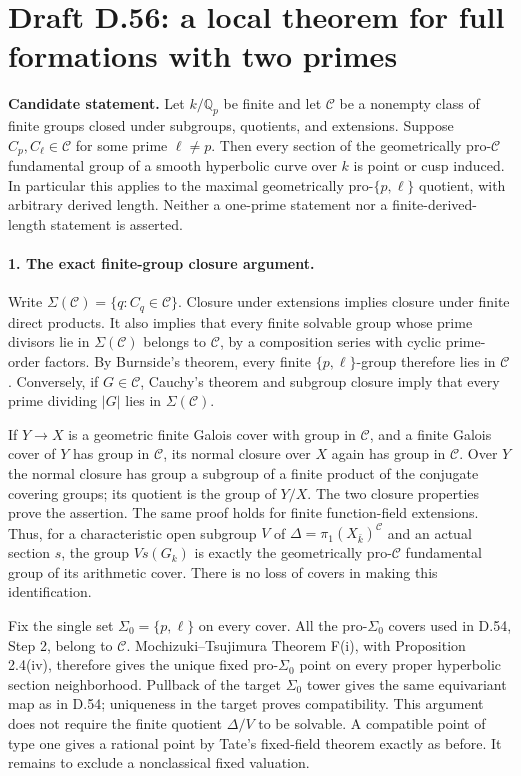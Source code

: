 \section*{Draft D.56: a local theorem for full formations with two primes}

\noindent\textbf{Candidate statement.}
Let $k/\mathbb Q_p$ be finite and let $\mathcal C$ be a nonempty
class of finite groups closed under subgroups, quotients, and
extensions.  Suppose $C_p,C_\ell\in\mathcal C$ for some prime
$\ell\ne p$.  Then every section of the geometrically pro-$\mathcal C$
fundamental group of a smooth hyperbolic curve over $k$ is point
or cusp induced.  In particular this applies to the maximal
geometrically pro-$\{p,\ell\}$ quotient, with arbitrary derived
length.  Neither a one-prime statement nor a finite-derived-length
statement is asserted.

\paragraph{1. The exact finite-group closure argument.}

Write $\Sigma(\mathcal C)=\{q:C_q\in\mathcal C\}$.  Closure under
extensions implies closure under finite direct products.  It also
implies that every finite solvable group whose prime divisors lie
in $\Sigma(\mathcal C)$ belongs to $\mathcal C$, by a composition
series with cyclic prime-order factors.  By Burnside's theorem,
every finite $\{p,\ell\}$-group therefore lies in $\mathcal C$.
Conversely, if $G\in\mathcal C$, Cauchy's theorem and subgroup
closure imply that every prime dividing $|G|$ lies in
$\Sigma(\mathcal C)$.

If $Y\to X$ is a geometric finite Galois cover with group in
$\mathcal C$, and a finite Galois cover of $Y$ has group in
$\mathcal C$, its normal closure over $X$ again has group in
$\mathcal C$.  Over $Y$ the normal closure has group a subgroup of
a finite product of the conjugate covering groups; its quotient
is the group of $Y/X$.  The two closure properties prove the
assertion.  The same proof holds for finite function-field
extensions.  Thus, for a characteristic open subgroup $V$ of
$\Delta=\pi_1(X_{\bar k})^{\mathcal C}$ and an actual section $s$,
the group $V s(G_k)$ is exactly the geometrically pro-$\mathcal C$
fundamental group of its arithmetic cover.  There is no loss of
covers in making this identification.

Fix the single set $\Sigma_0=\{p,\ell\}$ on every cover.  All the
pro-$\Sigma_0$ covers used in D.54, Step 2, belong to $\mathcal C$.
Mochizuki--Tsujimura Theorem F(i), with Proposition 2.4(iv),
therefore gives the unique fixed pro-$\Sigma_0$ point on every
proper hyperbolic section neighborhood.  Pullback of the target
$\Sigma_0$ tower gives the same equivariant map as in D.54;
uniqueness in the target proves compatibility.  This argument
does not require the finite quotient $\Delta/V$ to be solvable.
A compatible point of type one gives a rational point by Tate's
fixed-field theorem exactly as before.  It remains to exclude a
nonclassical fixed valuation.

